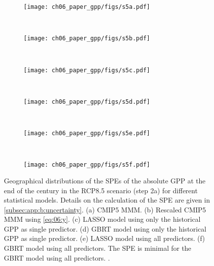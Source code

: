 \begin{figure}[p]
  \centering
  \begin{subfigure}[b]{\SubfigureWidth{}}
    \texttt{[image: ch06\_paper\_gpp/figs/s5a.pdf]}
    \caption{}
    \label{fig:app:b:step2a_results_errors:a}
  \end{subfigure}
  ~
  \begin{subfigure}[b]{\SubfigureWidth{}}
    \texttt{[image: ch06\_paper\_gpp/figs/s5b.pdf]}
    \caption{}
    \label{fig:app:b:step2a_results_errors:b}
  \end{subfigure}
  \\
  \begin{subfigure}[b]{\SubfigureWidth{}}
    \texttt{[image: ch06\_paper\_gpp/figs/s5c.pdf]}
    \caption{}
    \label{fig:app:b:step2a_results_errors:c}
  \end{subfigure}
  ~
  \begin{subfigure}[b]{\SubfigureWidth{}}
    \texttt{[image: ch06\_paper\_gpp/figs/s5d.pdf]}
    \caption{}
    \label{fig:app:b:step2a_results_errors:d}
  \end{subfigure}
  \\
  \begin{subfigure}[b]{\SubfigureWidth{}}
    \texttt{[image: ch06\_paper\_gpp/figs/s5e.pdf]}
    \caption{}
    \label{fig:app:b:step2a_results_errors:e}
  \end{subfigure}
  ~
  \begin{subfigure}[b]{\SubfigureWidth{}}
    \texttt{[image: ch06\_paper\_gpp/figs/s5f.pdf]}
    \caption{}
    \label{fig:app:b:step2a_results_errors:f}
  \end{subfigure}
  \caption[
    Geographical distributions of the \aclp{SPE} of the absolute \acf{GPP} at
    the end of the  century in the \acs{RCP}8.5 scenario (step 2a) for
    different statistical models.
  ]{
    Geographical distributions of the \acfp{SPE} of the absolute \acf{GPP} at
    the end of the  century in the \acs{RCP}8.5 scenario (step 2a) for
    different statistical models. Details on the calculation of the \acs{SPE}
    are given in \cref{subsec:app:b:uncertainty}. (a) \acs{CMIP}5 \acf{MMM}.
    (b) Rescaled \acs{CMIP}5 \acs{MMM} using \cref{eq:06:y}. (c) \Acf{LASSO}
    model using only the historical \acs{GPP} as single predictor. (d)
    \Acf{GBRT} model using only the historical \acs{GPP} as single predictor.
    (e) \acs{LASSO} model using all predictors. (f) \acs{GBRT} model using all
    predictors. The \acs{SPE} is minimal for the \acs{GBRT} model using all
    predictors. .
  }
  \label{fig:app:b:step2a_results_errors}
\end{figure}

